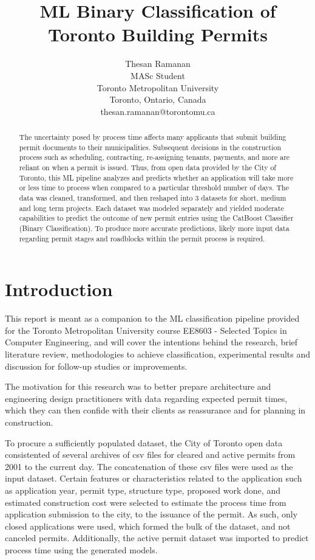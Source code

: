 \documentclass{article}
\title{ML Binary Classification of Toronto Building Permits
}
\author{
  Thesan Ramanan \\
  MASc Student \\
  Toronto Metropolitan University \\
  Toronto, Ontario, Canada\\
  thesan.ramanan@torontomu.ca \\ 
}
\begin{document}
\maketitle
\begin{abstract}
The uncertainty posed by process time affects many applicants that submit building permit documents to their municipalities. Subsequent decisions in the construction process such as scheduling, contracting, re-assigning tenants, payments, and more are reliant on when a permit is issued. Thus, from open data provided by the City of Toronto, this ML pipeline analyzes and predicts whether an application will take more or less time to process when compared to a particular threshold number of days. The data was cleaned, transformed, and then reshaped into 3 datasets for short, medium and long term projects. Each dataset was modeled separately and yielded moderate capabilities to predict the outcome of new permit entries using the CatBoost Classifier (Binary Classification). To produce more accurate predictions, likely more input data regarding permit stages and roadblocks within the permit process is required. 
\end{abstract}




\section{Introduction}
This report is meant as a companion to the ML classification pipeline provided for the Toronto Metropolitan University course EE8603 - Selected Topics in Computer Engineering, and will cover the intentions behind the research, brief literature review, methodologies to achieve classification, experimental results and discussion for follow-up studies or improvements. 

The motivation for this research was to better prepare architecture and engineering design practitioners with data regarding expected permit times, which they can then confide with their clients as reassurance and for planning in construction. 

To procure a sufficiently populated dataset, the City of Toronto open data consistented of several archives of csv files for cleared and active permits from 2001 to the current day. The concatenation of these csv files were used as the input dataset. Certain features or characteristics related to the application such as application year, permit type, structure type, proposed work done, and estimated construction cost were selected to estimate the process time from application submission to the city, to the issuance of the permit. As such, only closed applications were used, which formed the bulk of the dataset, and not canceled permits. Additionally, the active permit dataset was imported to predict process time using the generated models. 
\end{document}
